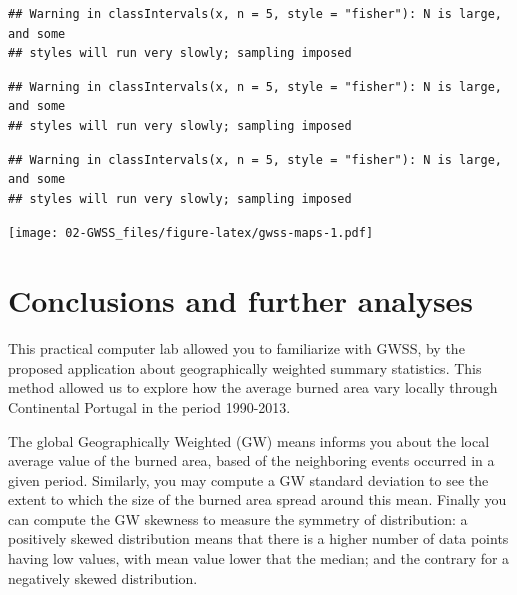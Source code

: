 \documentclass[
]{book}
\newenvironment{Shaded}{\begin{snugshade}}{\end{snugshade}}
\newcommand{\FunctionTok}[1]{\textcolor[rgb]{0.13,0.29,0.53}{\textbf{#1}}}
\newcommand{\NormalTok}[1]{#1}
\newcommand{\SpecialCharTok}[1]{\textcolor[rgb]{0.81,0.36,0.00}{\textbf{#1}}}
\newcommand{\StringTok}[1]{\textcolor[rgb]{0.31,0.60,0.02}{#1}}
\begin{document}
\begin{verbatim}
## Warning in classIntervals(x, n = 5, style = "fisher"): N is large, and some
## styles will run very slowly; sampling imposed
\end{verbatim}

\begin{Shaded}
\end{Shaded}

\begin{verbatim}
## Warning in classIntervals(x, n = 5, style = "fisher"): N is large, and some
## styles will run very slowly; sampling imposed
\end{verbatim}

\begin{Shaded}
\end{Shaded}

\begin{verbatim}
## Warning in classIntervals(x, n = 5, style = "fisher"): N is large, and some
## styles will run very slowly; sampling imposed
\end{verbatim}

\texttt{[image: 02-GWSS\_files/figure-latex/gwss-maps-1.pdf]}

\hypertarget{conclusions-and-further-analyses}{%
\section{Conclusions and further analyses}\label{conclusions-and-further-analyses}}

This practical computer lab allowed you to familiarize with GWSS, by the proposed application about geographically weighted summary statistics.
This method allowed us to explore how the average burned area vary locally through Continental Portugal in the period 1990-2013.

The global Geographically Weighted (GW) means informs you about the local average value of the burned area, based of the neighboring events occurred in a given period.
Similarly, you may compute a GW standard deviation to see the extent to which the size of the burned area spread around this mean.
Finally you can compute the GW skewness to measure the symmetry of distribution: a positively skewed distribution means that there is a higher number of data points having low values, with mean value lower that the median; and the contrary for a negatively skewed distribution.
\end{document}

